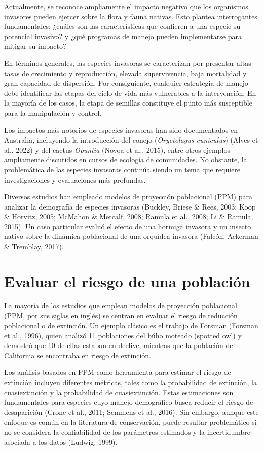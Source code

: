 \documentclass[
  12pt,
  letterpaper,
]{book}
\begin{document}
Actualmente, se reconoce ampliamente el impacto negativo que los
organismos invasores pueden ejercer sobre la flora y fauna nativas. Esto
plantea interrogantes fundamentales: ¿cuáles son las características que
confieren a una especie su potencial invasivo? y ¿qué programas de
manejo pueden implementarse para mitigar su impacto?

En términos generales, las especies invasoras se caracterizan por
presentar altas tasas de crecimiento y reproducción, elevada
supervivencia, baja mortalidad y gran capacidad de dispersión. Por
consiguiente, cualquier estrategia de manejo debe identificar las etapas
del ciclo de vida más vulnerables a la intervención. En la mayoría de
los casos, la etapa de semillas constituye el punto más susceptible para
la manipulación y control.

Los impactos más notorios de especies invasoras han sido documentados en
Australia, incluyendo la introducción del conejo (\emph{Oryctolagus
cuniculus}) (Alves et al., 2022) y del cactus \emph{Opuntia} (Novoa et
al., 2015), entre otros ejemplos ampliamente discutidos en cursos de
ecología de comunidades. No obstante, la problemática de las especies
invasoras continúa siendo un tema que requiere investigaciones y
evaluaciones más profundas.

Diversos estudios han empleado modelos de proyección poblacional (PPM)
para analizar la demografía de especies invasoras (Buckley, Briese \&
Rees, 2003; Koop \& Horvitz, 2005; McMahon \& Metcalf, 2008; Ramula et
al., 2008; Li \& Ramula, 2015). Un caso particular evaluó el efecto de
una hormiga invasora y un insecto nativo sobre la dinámica poblacional
de una orquídea invasora (Falcón, Ackerman \& Tremblay, 2017).

\section{Evaluar el riesgo de una
población}\label{evaluar-el-riesgo-de-una-poblaciuxf3n}

La mayoría de los estudios que emplean modelos de proyección poblacional
(PPM, por sus siglas en inglés) se centran en evaluar el riesgo de
reducción poblacional o de extinción. Un ejemplo clásico es el trabajo
de Forsman (Forsman et al., 1996), quien analizó 11 poblaciones del búho
moteado (spotted owl) y demostró que 10 de ellas estaban en declive,
mientras que la población de California se encontraba en riesgo de
extinción.

Los análisis basados en PPM como herramienta para estimar el riesgo de
extinción incluyen diferentes métricas, tales como la probabilidad de
extinción, la cuasiextinción y la probabilidad de cuasiextinción. Estas
estimaciones son fundamentales para especies cuyo manejo demográfico
busca reducir el riesgo de desaparición (Crone et al., 2011; Semmens et
al., 2016). Sin embargo, aunque este enfoque es común en la literatura
de conservación, puede resultar problemático si no se considera la
confiabilidad de los parámetros estimados y la incertidumbre asociada a
los datos (Ludwig, 1999).
\end{document}
